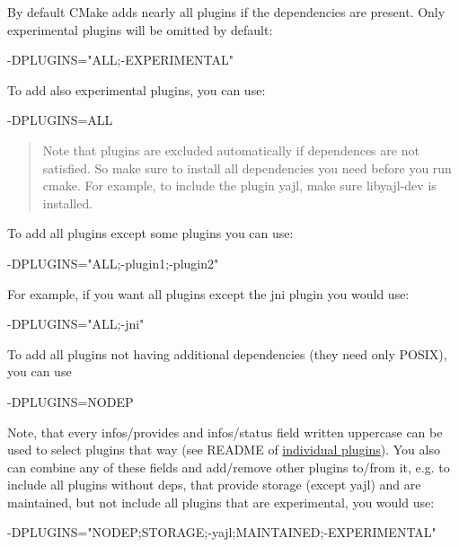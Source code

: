 By default C\+Make adds nearly all plugins if the dependencies are present. Only experimental plugins will be omitted by default\+:


\begin{DoxyCode}
-DPLUGINS="ALL;-EXPERIMENTAL"
\end{DoxyCode}


To add also experimental plugins, you can use\+:


\begin{DoxyCode}
-DPLUGINS=ALL
\end{DoxyCode}


\begin{quote}
Note that plugins are excluded automatically if dependences are not satisfied. So make sure to install all dependencies you need before you run {\ttfamily cmake}. For example, to include the plugin {\ttfamily yajl}, make sure {\ttfamily libyajl-\/dev} is installed. \end{quote}


To add all plugins except some plugins you can use\+:


\begin{DoxyCode}
-DPLUGINS="ALL;-plugin1;-plugin2"
\end{DoxyCode}


For example, if you want all plugins except the jni plugin you would use\+:


\begin{DoxyCode}
-DPLUGINS="ALL;-jni"
\end{DoxyCode}


To add all plugins not having additional dependencies (they need only P\+O\+S\+IX), you can use


\begin{DoxyCode}
-DPLUGINS=NODEP
\end{DoxyCode}


Note, that every {\ttfamily infos/provides} and {\ttfamily infos/status} field written uppercase can be used to select plugins that way (see R\+E\+A\+D\+ME of \hyperlink{src_plugins_README_md}{individual plugins}). You also can combine any of these fields and add/remove other plugins to/from it, e.\+g. to include all plugins without deps, that provide storage (except {\ttfamily yajl}) and are maintained, but not include all plugins that are experimental, you would use\+:


\begin{DoxyCode}
-DPLUGINS="NODEP;STORAGE;-yajl;MAINTAINED;-EXPERIMENTAL"
\end{DoxyCode}


